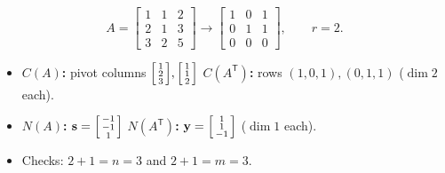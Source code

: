 \documentclass[aspectratio=169, 11pt]{beamer}
\newcommand{\yy}{\mathbf{y}}
\newcommand{\svec}{\mathbf{s}}
\newcommand{\T}{\mathsf{T}}
\begin{document}
\begin{frame}[t, plain]
  \[
    A=\begin{bmatrix} 1 & 1 & 2 \\ 2 & 1 & 3 \\ 3 & 2 & 5 \end{bmatrix}
    \longrightarrow
    \begin{bmatrix} 1 & 0 & 1 \\ 0 & 1 & 1 \\ 0 & 0 & 0 \end{bmatrix}, \qquad r=2.
  \]
  \begin{itemize}
    \setlength{\itemsep}{3pt}
    \item \textbf{$C(A)$:} pivot columns $\begin{bsmallmatrix} 1\\2\\3 \end{bsmallmatrix},\begin{bsmallmatrix} 1\\1\\2 \end{bsmallmatrix}$ \; \textbf{$C(A^{\T})$:} rows $(1,0,1),(0,1,1)$ \quad ($\dim 2$ each).
    \item \textbf{$N(A)$:} $\svec=\begin{bsmallmatrix} -1\\-1\\1 \end{bsmallmatrix}$ \; \textbf{$N(A^{\T})$:} $\yy=\begin{bsmallmatrix} 1\\1\\-1 \end{bsmallmatrix}$ \quad ($\dim 1$ each).
    \item Checks: $2+1=n=3$ and $2+1=m=3$.
  \end{itemize}
\end{frame}
\end{document}
